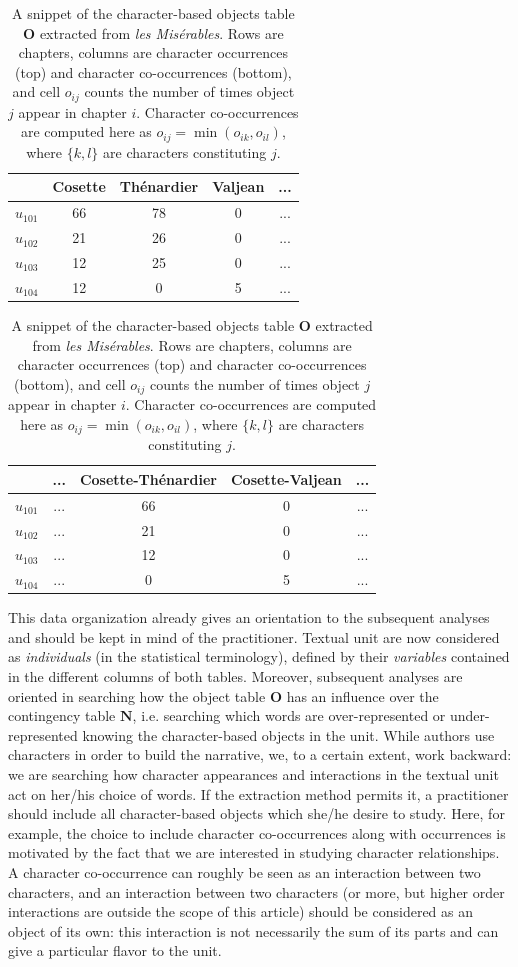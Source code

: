 \documentclass[
twocolumn,
]{ceurart}
\begin{document}
\begin{table}[h]
	\scriptsize
	\begin{tabular}{|c||c|c|c|c|}
		\hline
		& Cosette & Thénardier & Valjean & ... \\
		\hline
		\hline 
		$u_{101}$ & 66 & 78 & 0 & ... \\
		\hline
		$u_{102}$ & 21 & 26 & 0 & ... \\
		\hline
		$u_{103}$ & 12 & 25 & 0 & ... \\
		\hline
		$u_{104}$ & 12 & 0 & 5 & ... \\
		\hline
	\end{tabular}
	\begin{tabular}{|c||c|c|c|c|}
		\hline
		& ... & Cosette-Thénardier & Cosette-Valjean & ... \\
		\hline
		\hline 
		$u_{101}$  	& ... & 66 & 0 &  ... \\
		\hline
		$u_{102}$ 	& ... & 21 & 0 & ... \\
		\hline
		$u_{103}$  	& ... & 12 & 0 & ... \\
		\hline
		$u_{104}$ 	& ... & 0 & 5 & ... \\
		\hline
	\end{tabular}
	\label{occ_table}
	\caption{A snippet of the character-based objects table $\mathbf{O}$ extracted from \emph{les Misérables}. Rows are chapters, columns are character occurrences (top) and character co-occurrences (bottom), and cell $o_{ij}$ counts the number of times object $j$ appear in chapter $i$. Character co-occurrences are computed here as $o_{ij} = \min(o_{ik}, o_{il})$, where $\{k, l\}$ are characters constituting $j$.}
\end{table}

This data organization already gives an orientation to the subsequent analyses and should be kept in mind of the practitioner. Textual unit are now considered as \emph{individuals} (in the statistical terminology), defined by their \emph{variables} contained in the different columns of both tables. Moreover, subsequent analyses are oriented in searching how the object table $\mathbf{O}$ has an influence over the contingency table $\mathbf{N}$, i.e. searching which words are over-represented or under-represented knowing the character-based objects in the unit. While authors use characters in order to build the narrative, we, to a certain extent, work backward: we are searching how character appearances and interactions in the textual unit act on her/his choice of words. If the extraction method permits it, a practitioner should include all character-based objects which she/he desire to study. Here, for example, the choice to include character co-occurrences along with occurrences is motivated by the fact that we are interested in studying character relationships. A character co-occurrence can roughly be seen as an interaction between two characters, and an interaction between two characters (or more, but higher order interactions are outside the scope of this article) should be considered as an object of its own: this interaction is not necessarily the sum of its parts and can give a particular flavor to the unit.
\end{document}
